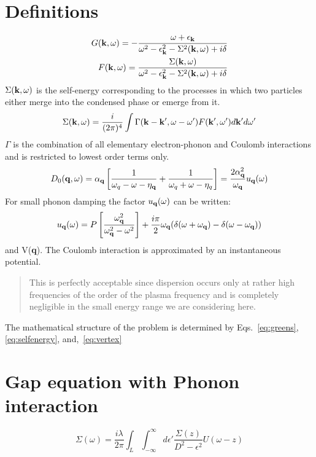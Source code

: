 \documentclass{article}
\def\k{{\bf k}}
\def\q{{\bf q}}
\begin{document}
\section{Definitions}
%
\begin{eqnarray}
\label{eq:greens}
G(\k,\omega)=-\frac{\omega + \epsilon_{\k}}{\omega^{2}-\epsilon^{2}_{\k}-\Sigma^{2}(\k,\omega)+i\delta}\nonumber\\
F(\k,\omega) = \frac{\Sigma(\k,\omega)}{\omega^{2}-\epsilon^{2}_{\k}-\Sigma^{2}(\k,\omega)+i\delta}
\end{eqnarray}
%
$\Sigma(\k,\omega)$ is the self-energy corresponding to the processes in which two particles either
merge into the condensed phase or emerge from it.
%
\begin{equation}
\label{eq:selfenergy}
\Sigma(\k,\omega) =\frac{i}{(2\pi)^{4}}\int \Gamma(\k-\k',\omega-\omega')F(\k',\omega')d\k'd\omega'
\end{equation}
%
$\Gamma$ is the combination of all elementary electron-phonon and Coulomb interactions and is restricted to lowest order terms only.
%
\begin{equation}
\label{eq:vertex}
D_{0}(\q,\omega) = \alpha_{\q}\left[ \frac{1}{\omega_{q} -\omega -\eta_{\q}} + \frac{1}{\omega_{q}+\omega-\eta_{q}} \right]= \frac{2\alpha^{2}_{\q}}{\omega_{\q}}u_{\q}(\omega)
\end{equation}
%
For small phonon damping the factor $u_{\q}(\omega)$ can be written:
%
\begin{equation}
u_{\q}(\omega) = P\left[\frac{\omega_{\q}^{2}}{\omega_{\q}^{2}-\omega^{2}}\right] + \frac{i\pi}{2}\omega_{\q}
(\delta(\omega+\omega_{\q}) - \delta(\omega-\omega_{\q}))
\end{equation}
%
and V(\q). The Coulomb interaction is approximated by an instantaneous potential.
%
\begin{quote}
This is perfectly acceptable since dispersion occurs only at rather high frequencies of the order of the plasma frequency and is completely negligible in the small energy range we are considering here.
\end{quote}
%
The mathematical structure of the problem is determined 
by Eqs.~\ref{eq:greens}, \ref{eq:selfenergy}, and,~\ref{eq:vertex}

\section{Gap equation with Phonon interaction}

\begin{equation}
\Sigma(\omega) = \frac{i \lambda}{2\pi} \int_{L}\int_{-\infty}^{\infty}d\epsilon'
\frac{\Sigma(z)}{D^{2}-\epsilon^{2}}U(\omega-z)
\end{equation}
\end{document}
